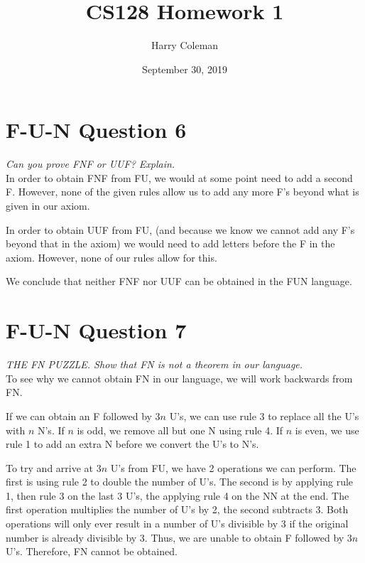 \documentclass[12pt]{article}
\begin{document}
 
 
\title{CS128 Homework 1}
\author{Harry Coleman}
\date{September 30, 2019}

\maketitle

\section{F-U-N Question 6}
\textit{Can you prove FNF or UUF? Explain.}
\\

In order to obtain FNF from FU, we would at some point need to add a second F. However, none of the given rules allow us to add any more F’s beyond what is given in our axiom.

In order to obtain UUF from FU, (and because we know we cannot add any F’s beyond that in the axiom) we would need to add letters before the F in the axiom. However, none of our rules allow for this.

We conclude that neither FNF nor UUF can be obtained in the FUN language.

\section{F-U-N Question 7}
\textit{THE FN PUZZLE. Show that FN is not a theorem in our language.}
\\

To see why we cannot obtain FN in our language, we will work backwards from FN. 

If we can obtain an F followed by $3n$ U’s, we can use rule 3 to replace all the U’s with $n$ N’s. If $n$ is odd, we remove all but one N using rule 4. If $n$ is even, we use rule 1 to add an extra N before we convert the U’s to N’s. 

To try and arrive at $3n$ U’s from FU, we have 2 operations we can perform. The first is using rule 2 to double the number of U’s. The second is by applying rule 1, then rule 3 on the last 3 U’s, the applying rule 4 on the NN at the end. The first operation multiplies the number of U’s by 2, the second subtracts 3. Both operations will only ever result in a number of U’s divisible by 3 if the original number is already divisible by 3. Thus, we are unable to obtain F followed by $3n$ U’s. Therefore, FN cannot be obtained.
\end{document}
